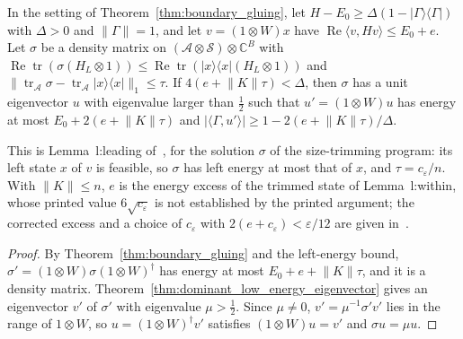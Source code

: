 \begin{theorem}
    \label{thm:leading_eigenvector_gluing}
    \leanok
    In the setting of Theorem~\ref{thm:boundary_gluing}, let
    $H-E_0\ge\Delta(1-\lvert\Gamma\rangle\langle\Gamma\rvert)$ with
    $\Delta>0$ and $\lVert\Gamma\rVert=1$, and let $v=(1\otimes W)x$ have
    $\operatorname{Re}\langle v,Hv\rangle\le E_0+e$. Let $\sigma$ be a density
    matrix on $(\mathcal A\otimes\mathcal S)\otimes\mathbb C^B$ with
    $\operatorname{Re}\operatorname{tr}(\sigma(H_L\otimes1))\le
        \operatorname{Re}\operatorname{tr}(\lvert x\rangle\langle x\rvert(H_L\otimes1))$
    and
    $\lVert\operatorname{tr}_{\mathcal A}\sigma
        -\operatorname{tr}_{\mathcal A}\lvert x\rangle\langle x\rvert\rVert_1\le\tau$.
    If $4(e+\lVert K\rVert\tau)<\Delta$, then $\sigma$ has a unit eigenvector
    $u$ with eigenvalue larger than $\tfrac12$ such that $u'=(1\otimes W)u$ has
    energy at most $E_0+2(e+\lVert K\rVert\tau)$ and
    $\lvert\langle\Gamma,u'\rangle\rvert\ge1-2(e+\lVert K\rVert\tau)/\Delta$.

    This is Lemma~l:leading of~\cite[lines 493--505]{Landau2013PolynomialTime},
    for the solution $\sigma$ of the size-trimming program: its left state $x$ of
    $v$ is feasible, so $\sigma$ has left energy at most that of $x$, and
    $\tau=c_\varepsilon/n$. With $\lVert K\rVert\le n$, $e$ is the energy
    excess of the trimmed state of Lemma~l:within, whose printed value
    $6\sqrt{c_\varepsilon}$ is not established by the printed argument; the
    corrected excess and a choice of $c_\varepsilon$ with
    $2(e+c_\varepsilon)<\varepsilon/12$ are given
    in~\cite{gap:lvv13_trimming_energy}.
\end{theorem}

\begin{proof}
    \leanok
    By Theorem~\ref{thm:boundary_gluing} and the left-energy bound,
    $\sigma'=(1\otimes W)\sigma(1\otimes W)^\dagger$ has energy at most
    $E_0+e+\lVert K\rVert\tau$, and it is a density matrix. Theorem~\ref{thm:dominant_low_energy_eigenvector}
    gives an eigenvector $v'$ of $\sigma'$ with eigenvalue $\mu>\tfrac12$. Since
    $\mu\ne0$, $v'=\mu^{-1}\sigma'v'$ lies in the range of $1\otimes W$, so
    $u=(1\otimes W)^\dagger v'$ satisfies $(1\otimes W)u=v'$ and
    $\sigma u=\mu u$.
\end{proof}

